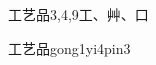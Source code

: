 \begin{entry}{工艺品}{3,4,9}{⼯、⾋、⼝}
  \begin{phonetics}{工艺品}{gong1yi4pin3}
  \end{phonetics}
\end{entry}
